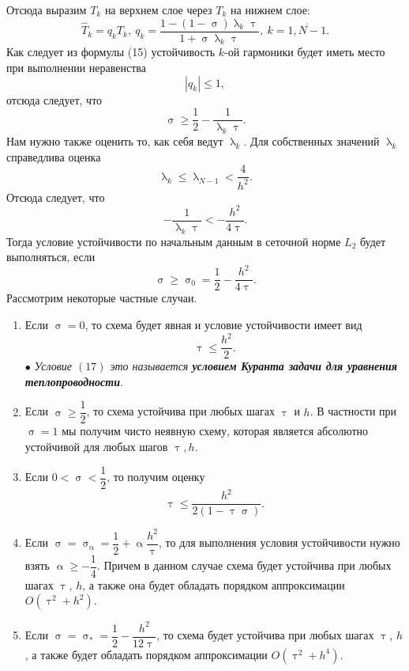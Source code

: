 \documentclass[a4paper, 12pt]{report}
\numberwithin{equation}{section}
\newcommand{\ol}{\overline}
\renewcommand{\leq}{\leqslant}
\renewcommand{\geq}{\geqslant}
\renewcommand{\alpha}{\upalpha}
\renewcommand{\tau}{\uptau}
\renewcommand{\lambda}{\uplambda}
\renewcommand{\sigma}{\upsigma}
\begin{document}
		Отсюда выразим $T_k$ на верхнем слое через $T_k$ на нижнем слое:
		\begin{equation}
			\hat T_k = q_k T_k,\ q_k = \dfrac{1 - (1-\sigma)\lambda_k \tau}{1+\sigma \lambda_k \tau},\ k = \ol {1, N-1}.
		\end{equation}
		Как следует из формулы (15) устойчивость $k$-ой гармоники будет иметь место при выполнении неравенства
		$$|q_k|\leq 1,$$
		отсюда следует, что 
		$$\sigma \geq \dfrac 12 - \dfrac{1}{\lambda_k \tau}.$$
		Нам нужно также оценить то, как себя ведут $\lambda_k$. Для собственных значений $\lambda_k$ справедлива оценка
		$$\lambda_k \leq \lambda _{N-1} < \dfrac{4}{h^2}.$$
		Отсюда следует, что 
		$$-\dfrac{1}{\lambda_k\tau} < -\dfrac{h^2}{4\tau}.$$
		Тогда условие устойчивости по начальным данным в сеточной норме $L_2$ будет выполняться, если 
		\begin{equation}
			\sigma \geq \sigma_0 = \dfrac 12 - \dfrac {h^2}{4\tau}.
		\end{equation}
		Рассмотрим некоторые частные случаи.
		\begin{enumerate}
			\item Если $\sigma = 0$, то схема будет явная и условие устойчивости имеет вид
			\begin{equation}
				\tau \leq \dfrac{h^2}{2}.
			\end{equation}
			$\bullet$ \textit{Условие $(17)$ это называется \textbf{условием Куранта задачи для уравнения теплопроводности}}.
			\item Если $\sigma \geq \dfrac 12$, то схема устойчива при любых шагах $\tau$ и $h$. В частности при $\sigma = 1$ мы получим чисто неявную схему, которая является абсолютно устойчивой для любых шагов $\tau, h$.
			\item Если $ 0 < \sigma < \dfrac 12$, то получим оценку
			\begin{equation}
				\tau \leq \dfrac{h^2}{2(1-\tau\sigma)}.
			\end{equation}
			\item Если $\sigma = \sigma_\alpha = \dfrac 12 + \alpha \dfrac {h^2}{\tau}$, то для выполнения условия устойчивости нужно взять $\alpha \geq -\dfrac 1 4$. Причем в данном случае схема будет устойчива при любых шагах $\tau$, $h$, а также она будет обладать порядком аппроксимации $O(\tau^2 + h^2)$.
			\item Если $\sigma = \sigma_* = \dfrac 12 - \dfrac{h^2}{12\tau}$, то схема будет устойчива при любых шагах $\tau$, $h$, а также будет обладать порядком аппроксимации $O(\tau^2 + h^4)$.
		\end{enumerate}
\end{document}
